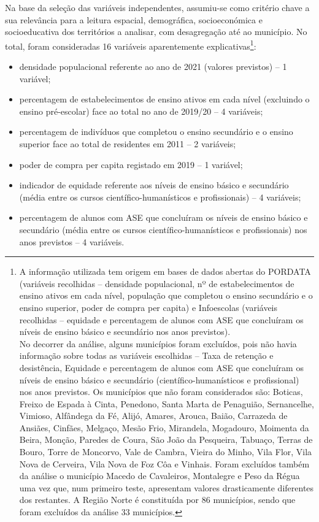 \documentclass[
]{book}
\providecommand{\tightlist}{%
  \setlength{\itemsep}{0pt}\setlength{\parskip}{0pt}}
\begin{document}
Na base da seleção das variáveis independentes, assumiu-se como critério chave a sua relevância para a leitura espacial, demográfica, socioeconómica e socioeducativa dos territórios a analisar, com desagregação até ao município. No total, foram consideradas 16 variáveis aparentemente explicativas\footnote{A informação utilizada tem origem em bases de dados abertas do PORDATA (variáveis recolhidas -- densidade populacional, nº de estabelecimentos de ensino ativos em cada nível, população que completou o ensino secundário e o ensino superior, poder de compra per capita) e Infoescolas (variáveis recolhidas -- equidade e percentagem de alunos com ASE que concluíram os níveis de ensino básico e secundário nos anos previstos).\\
  No decorrer da análise, alguns municípios foram excluídos, pois não havia informação sobre todas as variáveis escolhidas -- Taxa de retenção e desistência, Equidade e percentagem de alunos com ASE que concluíram os níveis de ensino básico e secundário (científico-humanísticos e profissional) nos anos previstos. Os municípios que não foram considerados são: Boticas, Freixo de Espada à Cinta, Penedono, Santa Marta de Penaguião, Sernancelhe, Vimioso, Alfândega da Fé, Alijó, Amares, Arouca, Baião, Carrazeda de Ansiães, Cinfães, Melgaço, Mesão Frio, Mirandela, Mogadouro, Moimenta da Beira, Monção, Paredes de Coura, São João da Pesqueira, Tabuaço, Terras de Bouro, Torre de Moncorvo, Vale de Cambra, Vieira do Minho, Vila Flor, Vila Nova de Cerveira, Vila Nova de Foz Côa e Vinhais. Foram excluídos também da análise o município Macedo de Cavaleiros, Montalegre e Peso da Régua uma vez que, num primeiro teste, apresentam valores drasticamente diferentes dos restantes. A Região Norte é constituída por 86 municípios, sendo que foram excluídos da análise 33 municípios.}:

\begin{itemize}
\tightlist
\item
  densidade populacional referente ao ano de 2021 (valores previstos) -- 1 variável;
\item
  percentagem de estabelecimentos de ensino ativos em cada nível (excluindo o ensino pré-escolar) face ao total no ano de 2019/20 -- 4 variáveis;
\item
  percentagem de indivíduos que completou o ensino secundário e o ensino superior face ao total de residentes em 2011 -- 2 variáveis;
\item
  poder de compra per capita registado em 2019 -- 1 variável;
\item
  indicador de equidade referente aos níveis de ensino básico e secundário (média entre os cursos científico-humanísticos e profissionais) -- 4 variáveis;
\item
  percentagem de alunos com ASE que concluíram os níveis de ensino básico e secundário (média entre os cursos científico-humanísticos e profissionais) nos anos previstos -- 4 variáveis.
\end{itemize}
\end{document}
